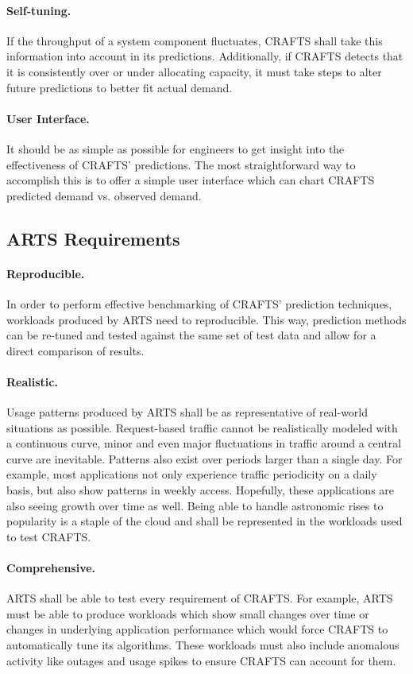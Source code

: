 \paragraph{Self-tuning.} If the throughput of a system component fluctuates, CRAFTS shall take this information into account in its predictions. Additionally, if CRAFTS detects that it is consistently over or under allocating capacity, it must take steps to alter future predictions to better fit actual demand.

\paragraph{User Interface.} It should be as simple as possible for engineers to get insight into the effectiveness of CRAFTS' predictions. The most straightforward way to accomplish this is to offer a simple user interface which can chart CRAFTS predicted demand vs. observed demand.

\subsection{ARTS Requirements}

\paragraph{Reproducible.} In order to perform effective benchmarking of CRAFTS' prediction techniques, workloads produced by ARTS need to reproducible. This way, prediction methods can be re-tuned and tested against the same set of test data and allow for a direct comparison of results.

\paragraph{Realistic.} Usage patterns produced by ARTS shall be as representative of real-world situations as possible. Request-based traffic cannot be realistically modeled with a continuous curve, minor and even major fluctuations in traffic around a central curve are inevitable. Patterns also exist over periods larger than a single day. For example, most applications not only experience traffic periodicity on a daily basis, but also show patterns in weekly access. Hopefully, these applications are also seeing growth over time as well. Being able to handle astronomic rises to popularity is a staple of the cloud and shall be represented in the workloads used to test CRAFTS.

\paragraph{Comprehensive.} ARTS shall be able to test every requirement of CRAFTS. For example, ARTS must be able to produce workloads which show small changes over time or changes in underlying application performance which would force CRAFTS to automatically tune its algorithms. These workloads must also include anomalous activity like outages and usage spikes to ensure CRAFTS can account for them.